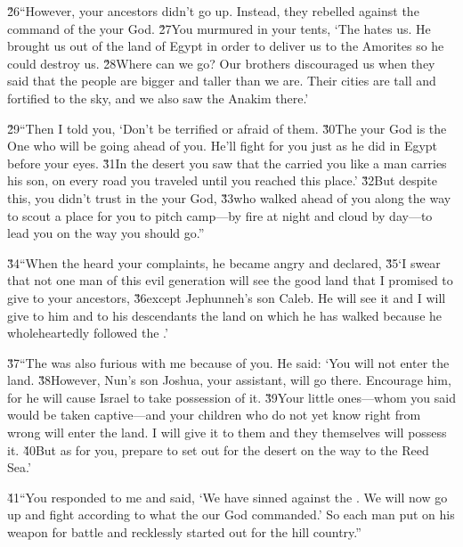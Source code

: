 \v{26}``However, your ancestors didn't go up. Instead, they rebelled against the command of the  your God. \v{27}You murmured in your tents, `The  hates us. He brought us out of the land of Egypt in order to deliver us to the Amorites so he could destroy us. \v{28}Where can we go? Our brothers discouraged us when they said that the people are bigger and taller than we are. Their cities are tall and fortified to the sky, and we also saw the Anakim there.'

\v{29}``Then I told you, `Don't be terrified or afraid of them. \v{30}The  your God is the One who will be going ahead of you. He'll fight for you just as he did in Egypt before your eyes. \v{31}In the desert you saw that the  carried you like a man carries his son, on every road you traveled until you reached this place.' \v{32}But despite this, you didn't trust in the  your God, \v{33}who walked ahead of you along the way to scout a place for you to pitch camp---by fire at night and cloud by day---to lead you on the way you should go.''

\v{34}``When the  heard your complaints, he became angry and declared, \v{35}`I swear that not one man of this evil generation will see the good land that I promised to give to your ancestors, \v{36}except Jephunneh's son Caleb. He will see it and I will give to him and to his descendants the land on which he has walked because he wholeheartedly followed the .'

\v{37}``The  was also furious with me because of you. He said: `You will not enter the land. \v{38}However, Nun's son Joshua, your assistant, will go there. Encourage him, for he will cause Israel to take possession of it. \v{39}Your little ones---whom you said would be taken captive---and your children who do not yet know right from wrong will enter the land. I will give it to them and they themselves will possess it. \v{40}But as for you, prepare to set out for the desert on the way to the Reed Sea.'

\v{41}``You responded to me and said, `We have sinned against the . We will now go up and fight according to what the  our God commanded.' So each man put on his weapon for battle and recklessly started out for the hill country.''

